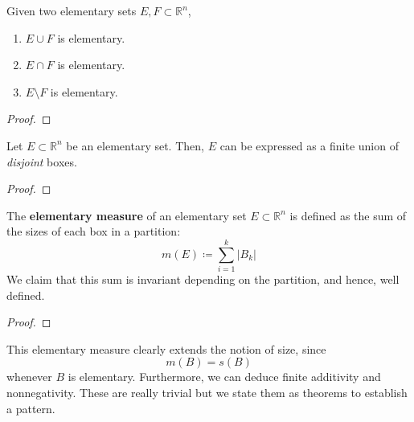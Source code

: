   \begin{lemma}
    Given two elementary sets $E, F \subset \mathbb{R}^n$, 
    \begin{enumerate}
      \item $E \cup F$ is elementary. 
      \item $E \cap F$ is elementary. 
      \item $E \setminus F$ is elementary. 
    \end{enumerate}
  \end{lemma}
  \begin{proof}
    
  \end{proof}

  \begin{lemma} 
    Let $E \subset \mathbb{R}^n$ be an elementary set. Then, $E$ can be expressed as a finite union of \textit{disjoint} boxes. 
  \end{lemma}
  \begin{proof}
    
  \end{proof}

  \begin{definition}
    The \textbf{elementary measure} of an elementary set $E \subset \mathbb{R}^n$ is defined as the sum of the sizes of each box in a partition: 
    \begin{equation}
      m(E) \coloneqq \sum_{i=1}^k |B_k|
    \end{equation}
    We claim that this sum is invariant depending on the partition, and hence, well defined. 
  \end{definition}
  \begin{proof}
    
  \end{proof}

  This elementary measure clearly extends the notion of size, since 
  \begin{equation}
    m(B) = s(B)
  \end{equation}
  whenever $B$ is elementary. Furthermore, we can deduce finite additivity and nonnegativity. These are really trivial but we state them as theorems to establish a pattern. 

